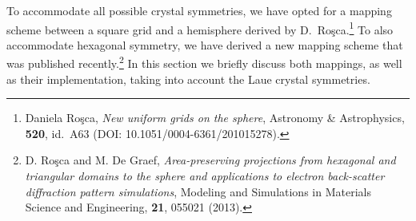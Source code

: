 \documentclass[DIV=calc, paper=letter, fontsize=11pt]{scrartcl}	 %
\begin{document}
To accommodate all possible crystal symmetries, we have opted for a mapping scheme between a square grid and a hemisphere derived by D.\ 
Ro\c{s}ca.\footnote{Daniela Ro\c{s}ca, \textit{New uniform grids on the sphere}, Astronomy \& Astrophysics, \textbf{520}, 
id.\ A63 (DOI: 10.1051/0004-6361/201015278).}
To also accommodate hexagonal symmetry, we have derived a new mapping scheme that was published recently.\footnote{D. Ro\c{s}ca and M. De Graef, 
\textit{Area-preserving projections from hexagonal and triangular domains to the sphere and applications to electron back-scatter diffraction pattern simulations}, 
Modeling and Simulations in Materials Science and Engineering, \textbf{21}, 055021 (2013).}  In this section we briefly discuss both mappings, as well 
as their implementation, taking into account the Laue crystal symmetries.
\end{document}
